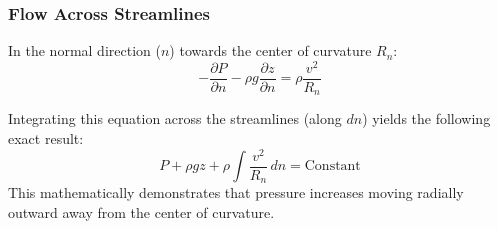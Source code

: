 \subsubsection{Flow Across Streamlines}

In the normal direction ($n$) towards the center of curvature $R_{n}$:
\begin{equation*}
    -\frac{\partial P}{\partial n} - \rho g \frac{\partial z}{\partial n} = \rho \frac{v^{2}}{R_{n}}
\end{equation*}

\begin{expertbox}
Integrating this equation across the streamlines (along $dn$) yields the following exact result:
\begin{equation*}
    P + \rho gz + \rho \int \frac{v^{2}}{R_{n}} \, dn = \text{Constant}
\end{equation*}
This mathematically demonstrates that pressure increases moving radially outward away from the center of curvature.
\end{expertbox}